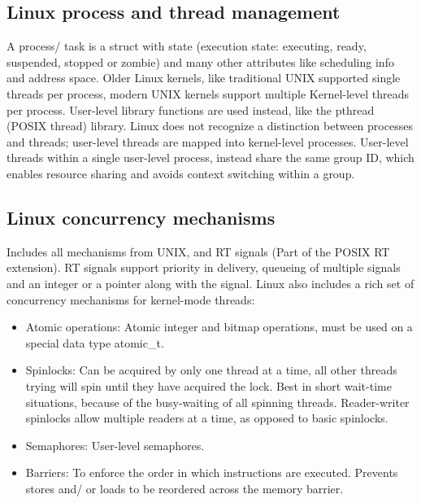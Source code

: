 \subsection{Linux process and thread management}
A process/ task is a struct with state (execution state: executing, ready, suspended, stopped or zombie) and many other attributes like scheduling info and address space.
Older Linux kernels, like traditional UNIX supported single threads per process, modern UNIX kernels support multiple Kernel-level threads per process. User-level library functions are used instead, like the pthread (POSIX thread) library.
Linux does not recognize a distinction between processes and threads; user-level threads are mapped into kernel-level processes. User-level threads within a single user-level process, instead share the same group ID, which enables resource sharing and avoids context switching within a group.

\subsection{Linux concurrency mechanisms}
Includes all mechanisms from UNIX, and RT signals (Part of the POSIX RT extension). RT signals support priority in delivery, queueing of multiple signals and an integer or a pointer along with the signal.
Linux also includes a rich set of concurrency mechanisms for kernel-mode threads:
\begin{itemize}
    \item Atomic operations: Atomic integer and bitmap operations, must be used on a special data type atomic\_t.
    \item Spinlocks: Can be acquired by only one thread at a time, all other threads trying will spin until they have acquired the lock. Best in short wait-time situations, because of the busy-waiting of all spinning threads. Reader-writer spinlocks allow multiple readers at a time, as opposed to basic spinlocks.
    \item Semaphores: User-level semaphores.
    \item Barriers: To enforce the order in which instructions are executed. Prevents stores and/ or loads to be reordered across the memory barrier.
\end{itemize}


